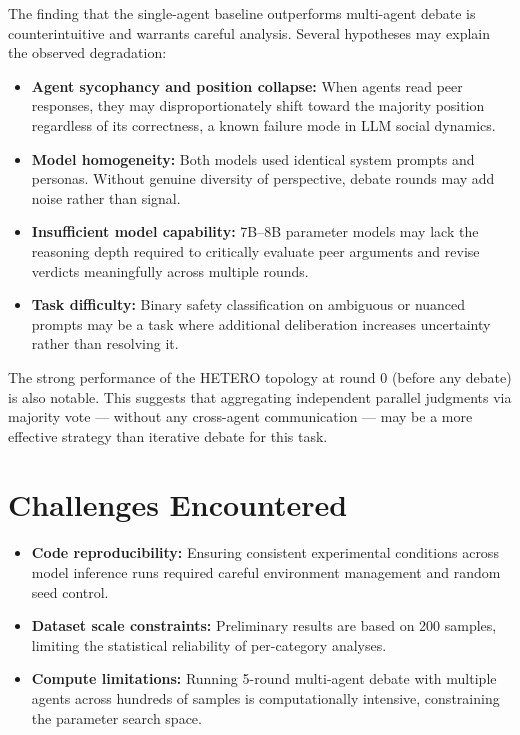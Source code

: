 \documentclass[11pt,a4paper]{article}
\begin{document}
The finding that the single-agent baseline outperforms multi-agent debate is counterintuitive and warrants careful analysis. Several hypotheses may explain the observed degradation:

\begin{itemize}
  \item \textbf{Agent sycophancy and position collapse:} When agents read peer responses, they may disproportionately shift toward the majority position regardless of its correctness, a known failure mode in LLM social dynamics.
  \item \textbf{Model homogeneity:} Both models used identical system prompts and personas. Without genuine diversity of perspective, debate rounds may add noise rather than signal.
  \item \textbf{Insufficient model capability:} 7B--8B parameter models may lack the reasoning depth required to critically evaluate peer arguments and revise verdicts meaningfully across multiple rounds.
  \item \textbf{Task difficulty:} Binary safety classification on ambiguous or nuanced prompts may be a task where additional deliberation increases uncertainty rather than resolving it.
\end{itemize}

The strong performance of the HETERO topology at round 0 (before any debate) is also notable. This suggests that aggregating independent parallel judgments via majority vote --- without any cross-agent communication --- may be a more effective strategy than iterative debate for this task.

\section{Challenges Encountered}

\begin{itemize}
  \item \textbf{Code reproducibility:} Ensuring consistent experimental conditions across model inference runs required careful environment management and random seed control.
  \item \textbf{Dataset scale constraints:} Preliminary results are based on 200 samples, limiting the statistical reliability of per-category analyses.
  \item \textbf{Compute limitations:} Running 5-round multi-agent debate with multiple agents across hundreds of samples is computationally intensive, constraining the parameter search space.
\end{itemize}
\end{document}
